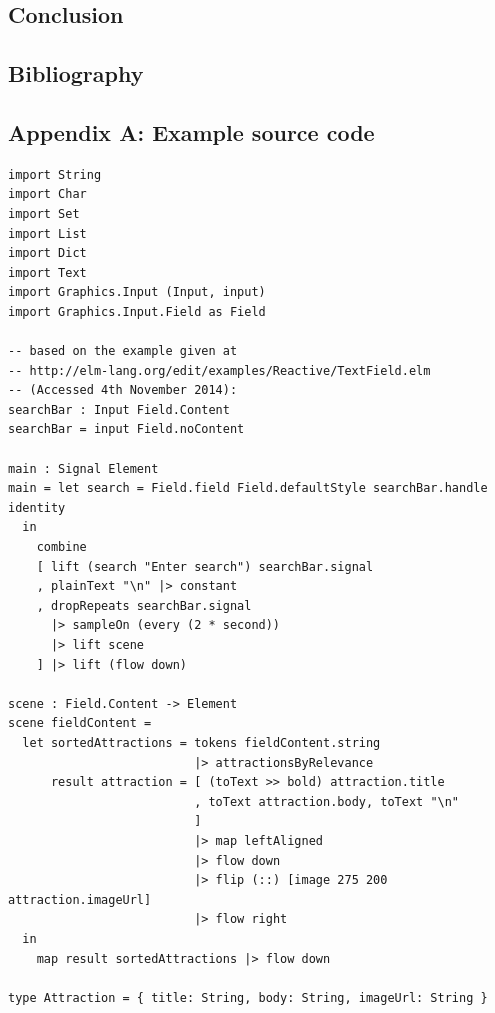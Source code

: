 \documentclass[12pt]{article}
\begin{document}
\section{Conclusion}

\section{Bibliography}



\begin{appendices}
\chapter{Appendix A: Example source code}
\label{app:A}
\begin{verbatim}
import String
import Char
import Set
import List
import Dict
import Text
import Graphics.Input (Input, input)
import Graphics.Input.Field as Field

-- based on the example given at 
-- http://elm-lang.org/edit/examples/Reactive/TextField.elm 
-- (Accessed 4th November 2014):
searchBar : Input Field.Content
searchBar = input Field.noContent

main : Signal Element
main = let search = Field.field Field.defaultStyle searchBar.handle identity
  in
    combine
    [ lift (search "Enter search") searchBar.signal
    , plainText "\n" |> constant
    , dropRepeats searchBar.signal 
      |> sampleOn (every (2 * second)) 
      |> lift scene
    ] |> lift (flow down)

scene : Field.Content -> Element
scene fieldContent = 
  let sortedAttractions = tokens fieldContent.string 
                          |> attractionsByRelevance
      result attraction = [ (toText >> bold) attraction.title
                          , toText attraction.body, toText "\n"
                          ] 
                          |> map leftAligned 
                          |> flow down
                          |> flip (::) [image 275 200 attraction.imageUrl]
                          |> flow right
  in 
    map result sortedAttractions |> flow down

type Attraction = { title: String, body: String, imageUrl: String }


\end{verbatim}
\end{appendices}
\end{document}
